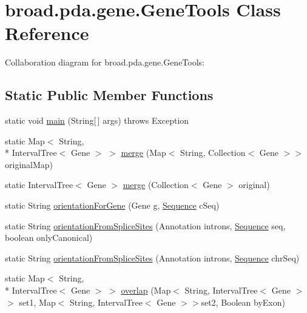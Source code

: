 \hypertarget{classbroad_1_1pda_1_1gene_1_1_gene_tools}{\section{broad.\+pda.\+gene.\+Gene\+Tools Class Reference}
\label{classbroad_1_1pda_1_1gene_1_1_gene_tools}
}


Collaboration diagram for broad.\+pda.\+gene.\+Gene\+Tools\+:
\subsection*{Static Public Member Functions}
\begin{DoxyCompactItemize}
\item 
static void \hyperlink{classbroad_1_1pda_1_1gene_1_1_gene_tools_aa133325339cd1c1f462c63c79eb16614}{main} (String\mbox{[}$\,$\mbox{]} args)  throws Exception  
\item 
static Map$<$ String, \\*
Interval\+Tree$<$ Gene $>$ $>$ \hyperlink{classbroad_1_1pda_1_1gene_1_1_gene_tools_a2685fed73a7ac2f3844e0e1bec280149}{merge} (Map$<$ String, Collection$<$ Gene $>$$>$ original\+Map)
\item 
static Interval\+Tree$<$ Gene $>$ \hyperlink{classbroad_1_1pda_1_1gene_1_1_gene_tools_ab23789788fe7d8da95ca3fb2b684deb6}{merge} (Collection$<$ Gene $>$ original)
\item 
static String \hyperlink{classbroad_1_1pda_1_1gene_1_1_gene_tools_a12ca89dece48d5d731b23700eab1c826}{orientation\+For\+Gene} (Gene g, \hyperlink{classbroad_1_1core_1_1sequence_1_1_sequence}{Sequence} c\+Seq)
\item 
static String \hyperlink{classbroad_1_1pda_1_1gene_1_1_gene_tools_a989535c5ffe26229bcb40967f70cf35a}{orientation\+From\+Splice\+Sites} (Annotation introns, \hyperlink{classbroad_1_1core_1_1sequence_1_1_sequence}{Sequence} seq, boolean only\+Canonical)
\item 
static String \hyperlink{classbroad_1_1pda_1_1gene_1_1_gene_tools_a2ec28016133f8194c34d96bca57049c5}{orientation\+From\+Splice\+Sites} (Annotation introns, \hyperlink{classbroad_1_1core_1_1sequence_1_1_sequence}{Sequence} chr\+Seq)
\item 
static Map$<$ String, \\*
Interval\+Tree$<$ Gene $>$ $>$ \hyperlink{classbroad_1_1pda_1_1gene_1_1_gene_tools_ae769dde9735577da2a6ad4099d03eda9}{overlap} (Map$<$ String, Interval\+Tree$<$ Gene $>$$>$ set1, Map$<$ String, Interval\+Tree$<$ Gene $>$$>$set2, Boolean by\+Exon)
$$
\end{DoxyCompactItemize}
